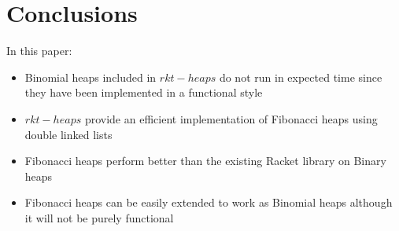 \documentclass{llncs}
\begin{document}
\newpage
\section{Conclusions}
In this paper:
\begin{itemize}
	\item Binomial heaps included in $rkt-heaps$ do not run in expected time since they have been implemented in a functional style
	\item $rkt-heaps$ provide an efficient implementation of Fibonacci heaps using double linked lists
	\item Fibonacci heaps perform better than the existing Racket library on Binary heaps
	\item Fibonacci heaps can be easily extended to work as Binomial heaps although it will not be purely functional
\end{itemize}




\newpage
\appendix


\newpage
\end{document}
